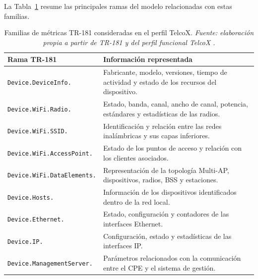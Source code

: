 La Tabla~\ref{tab:familias-metricas-telcox} resume las principales ramas
del modelo relacionadas con estas familias.

\begin{table}[H]
    \centering
    \small
    \renewcommand{\arraystretch}{1.35}

    \caption[Familias de métricas TR-181 utilizadas por TelcoX.]
    {Familias de métricas TR-181 consideradas en el perfil TelcoX.
    \textit{Fuente: elaboración propia a partir de TR-181 y del perfil
    funcional TelcoX \cite{bbf_tr181,telcox_bulkdata}.}}

    \label{tab:familias-metricas-telcox}

    \begin{tabular}{
        p{}
        p{}
    }
        \hline

        \textbf{Rama TR-181}
        &
        \textbf{Información representada}
        \\

        \hline

        \texttt{Device.DeviceInfo.}
        &
        Fabricante, modelo, versiones, tiempo de actividad y estado de
        los recursos del dispositivo.
        \\

        \texttt{Device.WiFi.Radio.}
        &
        Estado, banda, canal, ancho de canal, potencia, estándares y
        estadísticas de las radios.
        \\

        \texttt{Device.WiFi.SSID.}
        &
        Identificación y relación entre las redes inalámbricas y sus
        capas inferiores.
        \\

        \texttt{Device.WiFi.AccessPoint.}
        &
        Estado de los puntos de acceso y relación con los clientes
        asociados.
        \\

        \texttt{Device.WiFi.DataElements.}
        &
        Representación de la topología Multi-AP, dispositivos, radios,
        BSS y estaciones.
        \\

        \texttt{Device.Hosts.}
        &
        Información de los dispositivos identificados dentro de la red
        local.
        \\

        \texttt{Device.Ethernet.}
        &
        Estado, configuración y contadores de las interfaces Ethernet.
        \\

        \texttt{Device.IP.}
        &
        Configuración, estado y estadísticas de las interfaces IP.
        \\

        \texttt{Device.ManagementServer.}
        &
        Parámetros relacionados con la comunicación entre el CPE y el
        sistema de gestión.
        \\

        \hline
    \end{tabular}
\end{table}


